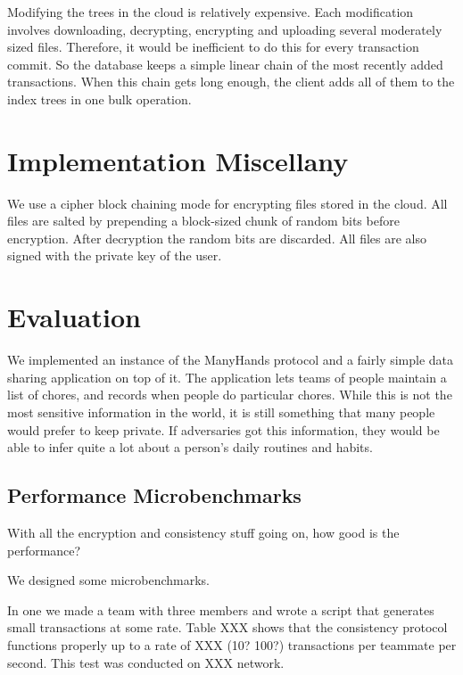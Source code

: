 \documentclass[pldi,10pt]{sigplanconf-pldi16}
\begin{document}
Modifying the trees in the cloud is relatively expensive.
Each modification involves downloading, decrypting, encrypting and uploading several moderately sized files.
Therefore, it would be inefficient to do this for every transaction commit.
So the database keeps a simple linear chain of the most recently added transactions.
When this chain gets long enough, the client adds all of them to the index trees in one bulk operation.

\section{Implementation Miscellany}

We use a cipher block chaining mode for encrypting files stored in the cloud.
All files are salted by prepending a block-sized chunk of random bits before encryption.
After decryption the random bits are discarded.
All files are also signed with the private key of the user.

\section{Evaluation}

We implemented an instance of the ManyHands protocol and a fairly simple data sharing application on top of it.
The application lets teams of people maintain a list of chores, and records when people do particular chores.
While this is not the most sensitive information in the world, it is still something that many people would prefer to keep private.
If adversaries got this information, they would be able to infer quite a lot about a person's daily routines and habits.

\subsection{Performance Microbenchmarks}

With all the encryption and consistency stuff going on, how good is the performance?

We designed some microbenchmarks.

In one we made a team with three members and wrote a script that generates small transactions at some rate.
Table XXX shows that the consistency protocol functions properly up to a rate of XXX (10? 100?) transactions per teammate per second.
This test was conducted on XXX network.
\end{document}
